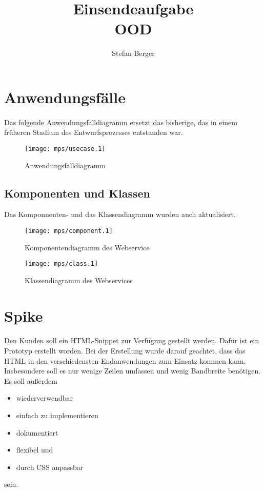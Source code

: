 \documentclass{article}
\begin{document}
\title{\Large Einsendeaufgabe \\ OOD}
\author{\normalsize Stefan Berger}
\date{}
\maketitle

\pagebreak

\section{Anwendungsfälle}
\paragraph{}
Das folgende Anwendungsfalldiagramm ersetzt das bisherige, das in einem früheren Stadium des Entwurfsprozesses entstanden war.
\vspace{50px}
\begin{figure}[h]
\centering
\texttt{[image: mps/usecase.1]}
\caption{Anwendungsfalldiagramm}
\end{figure}

\pagebreak

\begin{landscape}
\section{Komponenten und Klassen}
Das Komponnenten- und das Klassendiagramm wurden auch aktualisiert.
\vspace{50px}
\begin{figure}[h]
\centering
\texttt{[image: mps/component.1]}
\caption{Komponentendiagramm des Webservice}
\end{figure}

\pagebreak

\begin{figure}[h]
  \centering
  \texttt{[image: mps/class.1]}
  \caption{Klassendiagramm des Webservices}
\end{figure}

\end{landscape}

\section{Spike}
\paragraph{}
Den Kunden soll ein HTML-Snippet zur Verfügung gestellt werden. Dafür ist ein Prototyp erstellt worden. Bei der Erstellung wurde darauf geachtet, dass das HTML in den verschiedensten Endanwendungen zum Einsatz kommen kann. Insbesondere soll es nur wenige Zeilen umfassen und wenig Bandbreite benötigen. Es soll außerdem
\begin{itemize}
  \item wiederverwendbar
  \item einfach zu implementieren
  \item dokumentiert
  \item flexibel und
  \item durch CSS anpassbar
\end{itemize}
sein.
\end{document}
